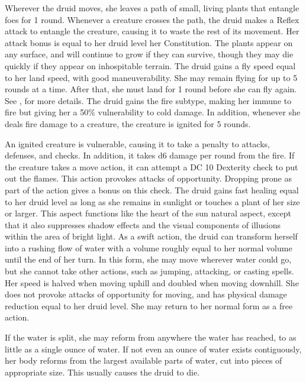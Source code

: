  Wherever the druid moves, she leaves a path of small, living plants that entangle foes for 1 round.  Whenever a creature crosses the path, the druid makes a Reflex attack to entangle the creature, causing it to waste the rest of its movement. Her attack bonus is equal to her druid level \add her Constitution. The plants appear on any surface, and will continue to grow if they can survive, though they may die quickly if they appear on inhospitable terrain.
 The druid gains a fly speed equal to her land speed, with good maneuverability. She may remain flying for up to 5 rounds at a time. After that, she must land for 1 round before she can fly again. See , for more details.
 The druid gains the fire subtype, making her immune to fire but giving her a 50\% vulnerability to cold damage. In addition, whenever she deals fire damage to a creature, the creature is ignited for 5 rounds.
\par An ignited creature is vulnerable, causing it to take a  penalty to attacks, defenses, and checks. In addition, it takes d6 damage per round from the fire. If the creature takes a move action, it can attempt a DC 10 Dexterity check to put out the flames. This action provokes attacks of opportunity. Dropping prone as part of the action gives a  bonus on this check.
 The druid gains fast healing equal to her druid level as long as she remains in sunlight or touches a plant of her size or larger.
 This aspect functions like the heart of the sun natural aspect, except that it also suppresses shadow effects and the visual components of illusions within the area of bright light. 
 As a swift action, the druid can transform herself into a rushing flow of water with a volume roughly equal to her normal volume until the end of her turn. In this form, she may move wherever water could go, but she cannot take other actions, such as jumping, attacking, or casting spells. Her speed is halved when moving uphill and doubled when moving downhill. She does not provoke attacks of opportunity for moving, and has physical damage reduction equal to her druid level. She may return to her normal form as a free action.
\par If the water is split, she may reform from anywhere the water has reached, to as little as a single ounce of water. If not even an ounce of water exists contiguously, her body reforms from the largest available parts of water, cut into pieces of appropriate size. This usually causes the druid to die.

